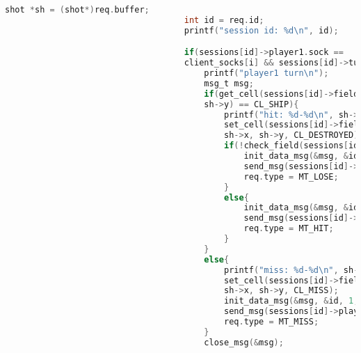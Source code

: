 \documentclass[12pt]{article}
\begin{document}
\begin{lstlisting}[language=C, basicstyle=\scriptsize]
                                    shot *sh = (shot*)req.buffer;
                                    int id = req.id;
                                    printf("session id: %d\n", id);

                                    if(sessions[id]->player1.sock ==
                                    client_socks[i] && sessions[id]->turn == 0){
                                        printf("player1 turn\n");
                                        msg_t msg;
                                        if(get_cell(sessions[id]->field2, sh->x,
                                        sh->y) == CL_SHIP){
                                            printf("hit: %d-%d\n", sh->x, sh->y);
                                            set_cell(sessions[id]->field2,
                                            sh->x, sh->y, CL_DESTROYED);
                                            if(!check_field(sessions[id]->field2)){
                                                init_data_msg(&msg, &id, 1, MT_WIN, id);
                                                send_msg(sessions[id]->player1.sock, &msg);
                                                req.type = MT_LOSE;
                                            }  
                                            else{
                                                init_data_msg(&msg, &id, 1, MT_HIT, id);
                                                send_msg(sessions[id]->player1.sock, &msg);
                                                req.type = MT_HIT;
                                            }
                                        }
                                        else{
                                            printf("miss: %d-%d\n", sh->x, sh->y);
                                            set_cell(sessions[id]->field2,
                                            sh->x, sh->y, CL_MISS);
                                            init_data_msg(&msg, &id, 1, MT_MISS, id);
                                            send_msg(sessions[id]->player1.sock, &msg);
                                            req.type = MT_MISS;
                                        }
                                        close_msg(&msg);


\end{lstlisting}
\end{document}
